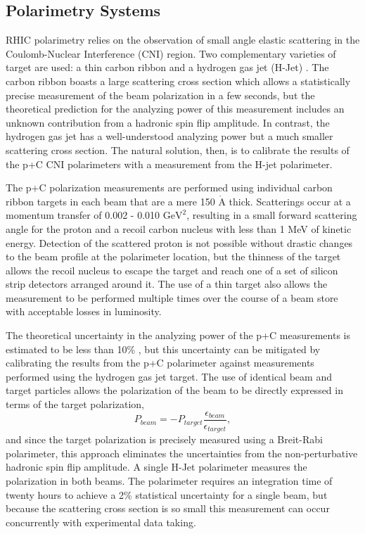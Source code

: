 \subsection{Polarimetry Systems}

RHIC polarimetry relies on the observation of small angle elastic scattering in the Coulomb-Nuclear Interference (CNI) region.  Two complementary varieties of target are used:  a thin carbon ribbon \cite{Jinnouchi:2004up} and a hydrogen gas jet (H-Jet) \cite{Zelenski:2005mz, Okada:2006dd}.  The carbon ribbon boasts a large scattering cross section which allows a statistically precise measurement of the beam polarization in a few seconds, but the theoretical prediction for the analyzing power of this measurement includes an unknown contribution from a hadronic spin flip amplitude.  In contrast, the hydrogen gas jet has a well-understood analyzing power but a much smaller scattering cross section.  The natural solution, then, is to calibrate the results of the p+C CNI polarimeters with a measurement from the H-jet polarimeter.

The p+C polarization measurements are performed using individual carbon ribbon targets in each beam that are a mere 150 $\mathrm{\mathring{A}}$ thick.  Scatterings occur at a momentum transfer of 0.002 - 0.010 $\mathrm{GeV}^2$, resulting in a small forward scattering angle for the proton and a recoil carbon nucleus with less than 1 MeV of kinetic energy.  Detection of the scattered proton is not possible without drastic changes to the beam profile at the polarimeter location, but the thinness of the target allows the recoil nucleus to escape the target and reach one of a set of silicon strip detectors arranged around it.  The use of a thin target also allows the measurement to be performed multiple times over the course of a beam store with acceptable losses in luminosity.

The theoretical uncertainty in the analyzing power of the p+C measurements is estimated to be less than 10\% \cite{Alekseev:2003sk}, but this uncertainty can be mitigated by calibrating the results from the p+C polarimeter against measurements performed using the hydrogen gas jet target.  The use of identical beam and target particles allows the polarization of the beam to be directly expressed in terms of the target polarization,
%
\begin{equation}
  P_{beam} = -P_{target}\frac{\epsilon_{beam}}{\epsilon_{target}},
\end{equation}
%
and since the target polarization is precisely measured using a Breit-Rabi polarimeter, this approach eliminates the uncertainties from the non-perturbative hadronic spin flip amplitude.  A single H-Jet polarimeter measures the polarization in both beams.  The polarimeter requires an integration time of twenty hours to achieve a 2\% statistical uncertainty for a single beam, but because the scattering cross section is so small this measurement can occur concurrently with experimental data taking.

